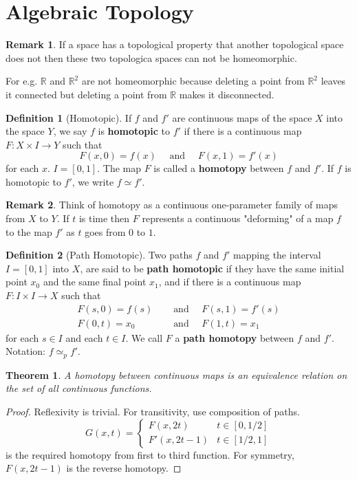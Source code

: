 \documentclass[12pt,reqno]{amsart}
\theoremstyle{plain}
\newtheorem{thm}{Theorem}
\theoremstyle{definition}
\newtheorem{defn}{Definition}
\newtheorem{rem}{Remark}
\newcommand{\bb}[1]{\mathbb{#1}}
\begin{document}
\section{Algebraic Topology}
\begin{rem}
    If a space has a topological property that another topological space does not then these two topologica spaces can not be homeomorphic.
    
    \noindent For e.g. $\bb R$ and $\bb R^2$ are not homeomorphic because deleting a point from $\bb R^2$ leaves it connected but deleting a point from $\bb R$ makes it disconnected.
\end{rem}
\begin{defn}[Homotopic]
    If $f$ and $f'$ are continuous maps of the space $X$ into the space $Y$, we say $f$ is {\bf homotopic} to $f'$ if there is a continuous map $F \colon X \times I \to Y$ such that 
    $$ F(x,0) = f(x) \quad \text{ and } \quad  F(x,1) = f'(x)$$
    for each $x$. $I = [0,1]$. The map $F$ is called a {\bf homotopy} between $f$ and $f'$. If $f$ is homotopic to $f'$, we write $f \simeq f'$.
\end{defn}
\begin{rem}
    Think of homotopy as a continuous one-parameter family of maps from $X$ to $Y$. If $t$ is time then $F$ represents a continuous "deforming" of a map $f$ to the map $f'$ as $t$ goes from $0$ to $1$.
\end{rem}
\begin{defn}[Path Homotopic]
    Two paths $f$ and $f'$ mapping the interval $I = [0,1]$ into $X$, are said to be {\bf path homotopic} if they have the same initial point $x_0$ and the same final point $x_1$, and if there is a continuous map $F \colon I \times I \to X$ such that 
    \begin{align*}
        F(s,0) = f(s) \quad &\text{ and } \quad  F(s,1) = f'(s) \\
        F(0,t) = x_0  \quad &\text{ and } \quad  F(1,t) = x_1
    \end{align*}
    for each $s \in I$ and each $t \in I$. We call $F$ a {\bf path homotopy} between $f$ and $f'$. Notation: $f \simeq_p f'$.
\end{defn}
\begin{thm}
    A homotopy between continuous maps is an equivalence relation on the set of all continuous functions. 
\end{thm}
\begin{proof}
    Reflexivity is trivial. For transitivity, use composition of paths.
    $$ G(x,t) = \begin{cases}
        F(x,2t) &t \in [0,1/2]\\
        F'(x,2t-1) & t \in [1/2, 1]
    \end{cases}
    $$ is the required homotopy from first to third function.
    For symmetry, $F(x, 2t-1)$ is the reverse homotopy.
\end{proof}
\end{document}
